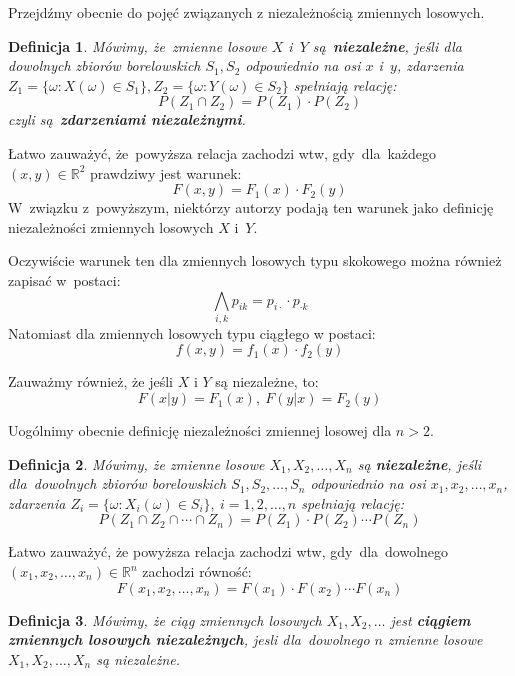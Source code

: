 \documentclass[10pt,a4paper]{article}
\newtheorem{definition}{Definicja}[section]
\numberwithin{equation}{subsection}
\begin{document}
Przejdźmy obecnie do pojęć związanych z niezależnością zmiennych losowych.
\begin{definition}
  Mówimy, że~zmienne losowe $X$ i~$Y$ są~\textbf{niezależne}, jeśli dla
  dowolnych zbiorów borelowskich $S_1,S_2$ odpowiednio na osi $x$ i~$y$,
  zdarzenia $Z_1=\{\omega:X(\omega)\in S_1\}, Z_2=\{\omega:Y(\omega)\in S_2\}$
  spełniają relację:
  \begin{equation}
    P(Z_1\cap Z_2) = P(Z_1)\cdot P(Z_2)
  \end{equation}
  czyli są~\textbf{zdarzeniami niezależnymi}.
\end{definition}

Łatwo zauważyć, że~powyższa relacja zachodzi wtw, gdy~dla~każdego
$(x,y)\in\mathbb{R}^2$ prawdziwy jest warunek:
\[
  F(x,y)=F_1(x)\cdot F_2(y)
\]
W~związku z~powyższym, niektórzy autorzy podają ten warunek jako definicję
niezależności zmiennych losowych $X$ i~$Y$.

Oczywiście warunek ten dla zmiennych losowych typu skokowego można również zapisać w~postaci:
\[
  \bigwedge_{i,k}p_{ik}=p_{i\cdot}\cdot p_{\cdot k}
\]
Natomiast dla zmiennych losowych typu ciągłego w postaci:
\[
  f(x,y)=f_1(x)\cdot f_2(y)
\]

Zauważmy również, że jeśli $X$ i $Y$ są niezależne, to:
\[
  F(x|y) = F_1(x),~F(y|x)=F_2(y)
\]

Uogólnimy obecnie definicję niezależności zmiennej losowej dla $n>2$.
\begin{definition}
  Mówimy, że zmienne losowe $X_1,X_2,\dotsc,X_n$ są \textbf{niezależne}, jeśli
  dla~dowolnych zbiorów borelowskich $S_1,S_2,\dotsc,S_n$ odpowiednio na osi
  $x_1,x_2,\dotsc,x_n$, zdarzenia $Z_i=\{\omega:X_i(\omega)\in S_i\},~i=1,2,
  \dotsc,n$ spełniają relację:
  \begin{equation}
    P(Z_1\cap Z_2 \cap\dotsb\cap Z_n) = P(Z_1)\cdot P(Z_2) \dotsm P(Z_n)
  \end{equation}
\end{definition}

Łatwo zauważyć, że powyższa relacja zachodzi wtw, gdy~dla~dowolnego
$(x_1,x_2,\dotsc,x_n)\in\mathbb{R}^n$ zachodzi równość:
\[
  F(x_1,x_2,\dotsc,x_n) = F(x_1) \cdot F(x_2) \dotsm F(x_n)
\]
\begin{definition}
  Mówimy, że ciąg zmiennych losowych $X_1,X_2,\dotsc$ jest \textbf{ciągiem
    zmiennych losowych niezależnych}, jesli dla~dowolnego $n$ zmienne losowe
  $X_1,X_2,\dotsc,X_n$ są niezależne.
\end{definition}
\end{document}
